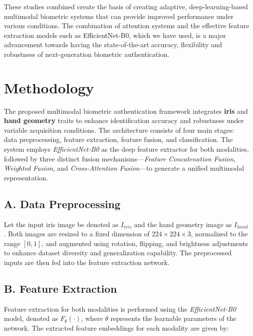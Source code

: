 \documentclass[12pt,a4paper]{report}
\begin{document}
These studies combined create the basis of creating adaptive, deep-learning-based multimodal biometric systems that can provide improved performance under various conditions. The combination of attention systems and the effective feature extraction models such as EfficientNet-B0, which we have used, is a major advancement towards having the state-of-the-art accuracy, flexibility and robustness of next-generation biometric authentication.

\section{Methodology}

The proposed multimodal biometric authentication framework integrates \textbf{iris} and \textbf{hand geometry} traits to enhance identification accuracy and robustness under variable acquisition conditions. The architecture consists of four main stages: data preprocessing, feature extraction, feature fusion, and classification. The system employs \textit{EfficientNet-B0} as the deep feature extractor for both modalities, followed by three distinct fusion mechanisms---\textit{Feature Concatenation Fusion}, \textit{Weighted Fusion}, and \textit{Cross-Attention Fusion}---to generate a unified multimodal representation.

\subsection*{A. Data Preprocessing}

Let the input iris image be denoted as \( I_{iris} \) and the hand geometry image as \( I_{hand} \). Both images are resized to a fixed dimension of \(224 \times 224 \times 3\), normalized to the range \([0,1]\), and augmented using rotation, flipping, and brightness adjustments to enhance dataset diversity and generalization capability. The preprocessed inputs are then fed into the feature extraction network.

\subsection*{B. Feature Extraction}

Feature extraction for both modalities is performed using the \textit{EfficientNet-B0} model, denoted as \( F_{\theta}(\cdot) \), where \( \theta \) represents the learnable parameters of the network. The extracted feature embeddings for each modality are given by:
\end{document}
